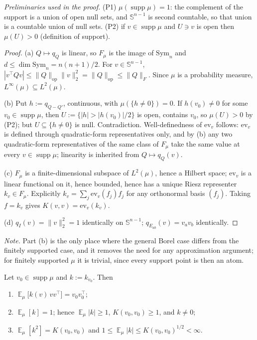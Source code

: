 \documentclass{aicr-solution}
\newcommand{\Expect}{\operatorname*{\mathbb{E}}}
\newcommand{\Sph}{\mathbb{S}^{n-1}}
\newcommand{\Sym}[1]{\mathrm{Sym}_{#1}}
\newcommand{\supp}{\operatorname{supp}}
\newcommand{\ev}{\mathrm{ev}}
\begin{document}
\emph{Preliminaries used in the proof.} (P1) $\mu(\supp\mu) = 1$: the
complement of the support is a union of open null sets, and $\Sph$ is
second countable, so that union is a countable union of null sets.
(P2) if $v \in \supp \mu$ and $U \ni v$ is open then $\mu(U) > 0$
(definition of support).

\begin{proof}
(a) $Q \mapsto q_{Q}$ is linear, so $F_{\mu}$ is the image of
$\Sym{n}$ and $d \le \dim \Sym{n} = n(n+1)/2$. For $v \in \Sph$,
$|v^{\top}Qv| \le \|Q\|_{\mathrm{op}}\|v\|_{2}^{2} = \|Q\|_{\mathrm{op}}
\le \|Q\|_{F}$. Since $\mu$ is a probability measure, $L^{\infty}(\mu)
\subseteq L^{2}(\mu)$.

(b) Put $h := q_{Q-Q'}$, continuous, with $\mu(\{h \ne 0\}) = 0$. If
$h(v_{0}) \ne 0$ for some $v_{0} \in \supp\mu$, then $U := \{|h| >
|h(v_{0})|/2\}$ is open, contains $v_{0}$, so $\mu(U) > 0$ by (P2); but
$U \subseteq \{h \ne 0\}$ is null. Contradiction. Well-definedness of
$\ev_{v}$ follows: $\ev_{v}$ is defined through quadratic-form
representatives only, and by (b) any two quadratic-form
representatives of the same class of $F_{\mu}$ take the same value at
every $v \in \supp\mu$; linearity is inherited from $Q \mapsto
q_{Q}(v)$.

(c) $F_{\mu}$ is a finite-dimensional subspace of $L^{2}(\mu)$, hence
a Hilbert space; $\ev_{v}$ is a linear functional on it, hence
bounded, hence has a unique Riesz representer $k_{v} \in F_{\mu}$.
Explicitly $k_{v} = \sum_{j} \ev_{v}(f_{j}) f_{j}$ for any orthonormal
basis $(f_{j})$. Taking $f = k_{v}$ gives $K(v,v) = \ev_{v}(k_{v})$.

(d) $q_{I}(v) = \|v\|_{2}^{2} = 1$ identically on $\Sph$;
$q_{E_{ab}}(v) = v_{a}v_{b}$ identically.
\end{proof}

\smallskip
\noindent\emph{Note.} Part (b) is the only place where the general
Borel case differs from the finitely supported case, and it removes
the need for any approximation argument; for finitely supported $\mu$
it is trivial, since every support point is then an atom.

\begin{lemma}\label{lem:kernel-identities}
Let $v_{0} \in \supp\mu$ and $k := k_{v_{0}}$. Then
\begin{enumerate}
\item[(i)] $\Expect_{\mu}\big[k(v)\,vv^{\top}\big] = v_{0}v_{0}^{\top}$;
\item[(ii)] $\Expect_{\mu}[k] = 1$; hence $\Expect_{\mu}|k| \ge 1$,
  $K(v_{0},v_{0}) \ge 1$, and $k \ne 0$;
\item[(iii)] $\Expect_{\mu}[k^{2}] = K(v_{0},v_{0})$ and
  $1 \le \Expect_{\mu}|k| \le K(v_{0},v_{0})^{1/2} < \infty$.
\end{enumerate}
\end{lemma}
\end{document}

